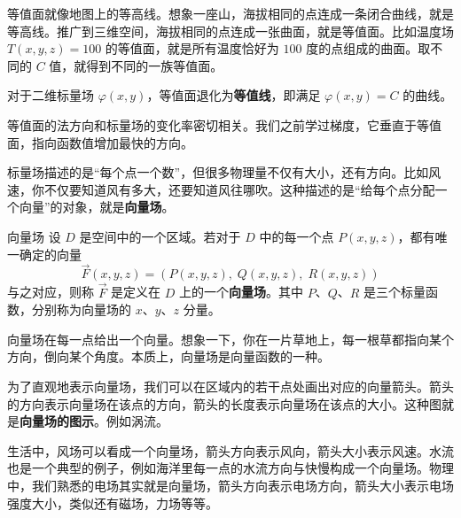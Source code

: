 等值面就像地图上的等高线。想象一座山，海拔相同的点连成一条闭合曲线，就是等高线。推广到三维空间，海拔相同的点连成一张曲面，就是等值面。比如温度场 $T(x, y, z) = 100$ 的等值面，就是所有温度恰好为 $100$ 度的点组成的曲面。取不同的 $C$ 值，就得到不同的一族等值面。

对于二维标量场 $\varphi(x, y)$，等值面退化为\textbf{等值线}，即满足 $\varphi(x, y) = C$ 的曲线。

等值面的法方向和标量场的变化率密切相关。我们之前学过梯度，它垂直于等值面，指向函数值增加最快的方向。

标量场描述的是“每个点一个数”，但很多物理量不仅有大小，还有方向。比如风速，你不仅要知道风有多大，还要知道风往哪吹。这种描述的是“给每个点分配一个向量”的对象，就是\textbf{向量场}。

\begin{definition}{向量场}{}
设 $D$ 是空间中的一个区域。若对于 $D$ 中的每一个点 $P(x, y, z)$，都有唯一确定的向量
\[
\vec{F}(x, y, z) = (P(x, y, z),\; Q(x, y, z),\; R(x, y, z))
\]
与之对应，则称 $\vec{F}$ 是定义在 $D$ 上的一个\textbf{向量场}。其中 $P$、$Q$、$R$ 是三个标量函数，分别称为向量场的 $x$、$y$、$z$ 分量。
\end{definition}

向量场在每一点给出一个向量。想象一下，你在一片草地上，每一根草都指向某个方向，倒向某个角度。本质上，向量场是向量函数的一种。

为了直观地表示向量场，我们可以在区域内的若干点处画出对应的向量箭头。箭头的方向表示向量场在该点的方向，箭头的长度表示向量场在该点的大小。这种图就是\textbf{向量场的图示}。例如涡流。

\begin{center}
\end{center}

生活中，风场可以看成一个向量场，箭头方向表示风向，箭头大小表示风速。水流也是一个典型的例子，例如海洋里每一点的水流方向与快慢构成一个向量场。物理中，我们熟悉的电场其实就是向量场，箭头方向表示电场方向，箭头大小表示电场强度大小，类似还有磁场，力场等等。

